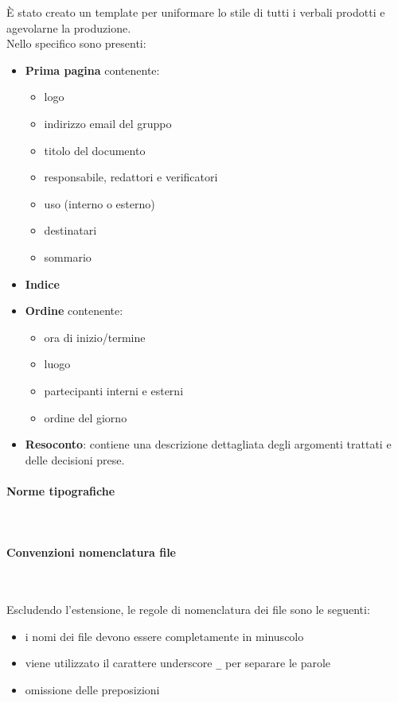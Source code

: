 È stato creato un template per uniformare lo stile di tutti i verbali prodotti e agevolarne la produzione.\\
Nello specifico sono presenti:
\begin{itemize}
    \item \textbf{Prima pagina} contenente:
          \begin {itemize}
    \item logo
    \item indirizzo email del gruppo
    \item titolo del documento
    \item responsabile, redattori e verificatori
    \item uso (interno o esterno)
    \item destinatari
    \item sommario
\end{itemize}
\item \textbf{Indice}
\item \textbf{Ordine} contenente:
\begin {itemize}
\item ora di inizio/termine
\item luogo
\item partecipanti interni e esterni
\item ordine del giorno
\end{itemize}
\item \textbf{Resoconto}: contiene una descrizione dettagliata degli argomenti trattati e delle decisioni prese.
\end{itemize}

\paragraph{Norme tipografiche} ~

\paragraph{Convenzioni nomenclatura file} ~

Escludendo l'estensione, le regole di nomenclatura dei file sono le seguenti:
\begin{itemize}
    \item i nomi dei file devono essere completamente in minuscolo
    \item viene utilizzato il carattere underscore \texttt{\_} per separare le parole
    \item omissione delle preposizioni
\end{itemize}

